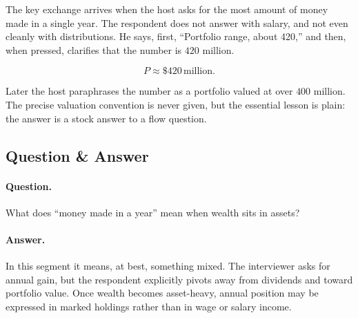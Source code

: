 \begin{figure}[h]
\centering
{}
\end{figure}

The key exchange arrives when the host asks for the most amount of money made in a single year. The respondent does not answer with salary, and not even cleanly with distributions. He says, first, ``Portfolio range, about 420,'' and then, when pressed, clarifies that the number is \(420\) million.

\begin{equation}
P \approx \$420\,\text{million}.
\end{equation}

Later the host paraphrases the number as a portfolio valued at over \(400\) million. The precise valuation convention is never given, but the essential lesson is plain: the answer is a stock answer to a flow question.

\subsection{Question \& Answer}

\paragraph{Question.} What does ``money made in a year'' mean when wealth sits in assets?

\paragraph{Answer.} In this segment it means, at best, something mixed. The interviewer asks for annual gain, but the respondent explicitly pivots away from dividends and toward portfolio value. Once wealth becomes asset-heavy, annual position may be expressed in marked holdings rather than in wage or salary income.

